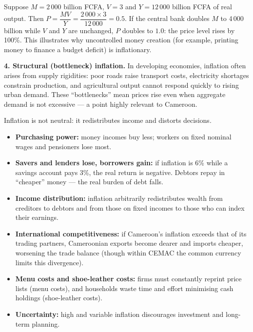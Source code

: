 \documentclass[11pt]{article}
\newcounter{popsec}
\newcounter{popsub}
\newcommand{\courssub}[1]{%
  \stepcounter{popsub}%
  \par\vspace{9pt}\noindent{\popxbold\fontsize{11.5}{13}\selectfont\color{popink}{\color{poporange}\thepopsec.\thepopsub}\hspace{6pt}#1}\par\nopagebreak\vspace{4pt}
}
\begin{document}
\begin{exemplebox}[Applying $MV = PY$]
Suppose $M = 2\,000$ billion FCFA, $V = 3$ and $Y = 12\,000$ billion FCFA of real output. Then $P = \dfrac{MV}{Y} = \dfrac{2\,000 \times 3}{12\,000} = 0.5$. If the central bank doubles $M$ to 4\,000 billion while $V$ and $Y$ are unchanged, $P$ doubles to $1.0$: the price level rises by 100\%. This illustrates why uncontrolled money creation (for example, printing money to finance a budget deficit) is inflationary.
\end{exemplebox}

\textbf{4. Structural (bottleneck) inflation.} In developing economies, inflation often arises from supply rigidities: poor roads raise transport costs, electricity shortages constrain production, and agricultural output cannot respond quickly to rising urban demand. These ``bottlenecks'' mean prices rise even when aggregate demand is not excessive --- a point highly relevant to Cameroon.

\courssub{The Effects of Inflation}

Inflation is not neutral: it redistributes income and distorts decisions.

\begin{itemize}
\item \textbf{Purchasing power:} money incomes buy less; workers on fixed nominal wages and pensioners lose most.
\item \textbf{Savers and lenders lose, borrowers gain:} if inflation is 6\% while a savings account pays 3\%, the real return is negative. Debtors repay in ``cheaper'' money --- the real burden of debt falls.
\item \textbf{Income distribution:} inflation arbitrarily redistributes wealth from creditors to debtors and from those on fixed incomes to those who can index their earnings.
\item \textbf{International competitiveness:} if Cameroon's inflation exceeds that of its trading partners, Cameroonian exports become dearer and imports cheaper, worsening the trade balance (though within CEMAC the common currency limits this divergence).
\item \textbf{Menu costs and shoe-leather costs:} firms must constantly reprint price lists (menu costs), and households waste time and effort minimising cash holdings (shoe-leather costs).
\item \textbf{Uncertainty:} high and variable inflation discourages investment and long-term planning.
\end{itemize}
\end{document}
